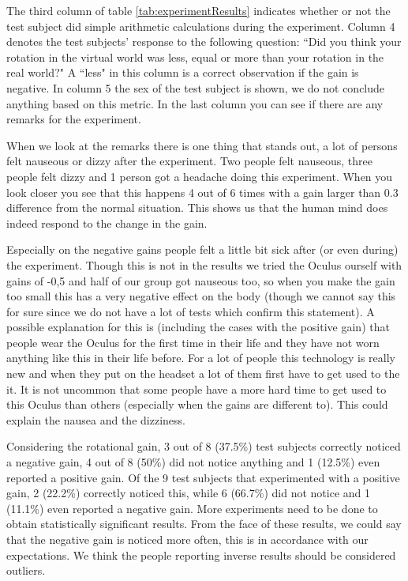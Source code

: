 The third column of table \ref{tab:experimentResults} indicates whether or not the test subject did simple arithmetic calculations during the experiment. 
Column 4 denotes the test subjects'  response to the following question: ``Did you think your rotation in the virtual world was less, equal or more than your rotation in the real world?"
A ``less" in this column is a correct observation if the gain is negative. 
In column 5 the sex of the test subject is shown, we do not conclude anything based on this metric.%
In the last column you can see if there are any remarks for the experiment.

When we look at the remarks there is one thing that stands out, a lot of persons felt nauseous or dizzy after the experiment. 
Two people felt nauseous, three people felt dizzy and 1 person got a headache doing this experiment. 
When you look closer you see that this happens 4 out of 6 times with a gain larger than 0.3 difference from the normal situation. 
This shows us that the human mind does indeed respond to the change in the gain. 

Especially on the negative gains people felt a little bit sick after (or even during) the experiment. 
Though this is not in the results we tried the Oculus ourself with gains of -0,5 and half of our group got nauseous too, so when you make the gain too small this has a very negative effect on the body (though we cannot say this for sure since we do not have a lot of tests which confirm this statement). 
A possible explanation for this is (including the cases with the positive gain) that people wear the Oculus for the first time in their life and they have not worn anything like this in their life before. 
For a lot of people this technology is really new and when they put on the headset a lot of them first have to get used to the it. 
It is not uncommon that some people have a more hard time to get used to this Oculus than others (especially when the gains are different to). 
This could explain the nausea and the dizziness.

Considering the rotational gain, 3 out of 8 (37.5\%) test subjects correctly noticed a negative gain, 4 out of 8 (50\%) did not notice anything and 1 (12.5\%) even reported a positive gain.
Of the 9 test subjects that experimented with a positive gain, 2 (22.2\%) correctly noticed this, while 6 (66.7\%) did not notice and 1 (11.1\%) even reported a negative gain.
More experiments need to be done to obtain statistically significant results.
From the face of these results, we could say that the negative gain is noticed more often, this is in accordance with our expectations.
We think the people reporting inverse results should be considered outliers.


